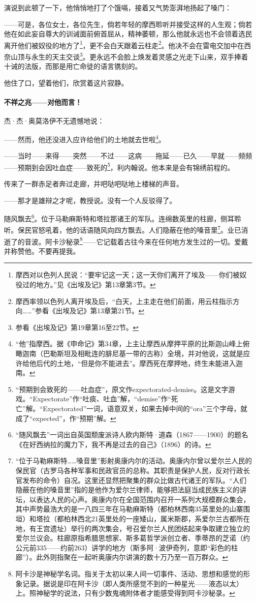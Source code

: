 \par 演说到此顿了一下，他悄悄地打了个饿嗝，接着又气势澎湃地扬起了嗓门：
\par ——可是，各位女士，各位先生，倘若年轻的摩西聆听并接受这样的人生观；倘若他在如此妄自尊大的训诫面前俯首屈从，精神萎顿，那么他就永远也不会领着选民离开他们被奴役的地方了\footnote{摩西对以色列人民说：“要牢记这一天；这一天你们离开了埃及——你们被奴役过的地方。”见《出埃及记》第13章第3节。}，更不会白天跟着云柱走\footnote{摩西率领以色列人离开埃及后，“白天，上主走在他们前面，用云柱指示方向……”参看《出埃及记》第13章第21节。}。他决不会在雷电交加中在西奈山顶与永生的天主交谈\footnote{参看《出埃及记》第19章第16至22节。}。更永远不会脸上焕发着灵感之光走下山来，双手捧着十诫的法版，而那是用亡命徒的语言镌刻的。
\par 他住了口，望着他们，欣赏着这片寂静。
\paragraph*{不祥之兆——对他而言！}
\par 杰·杰·奥莫洛伊不无遗憾地说：
\par ——然而，他还没进入应许给他们的土地就去世啦\footnote{“他”指摩西。据《申命记》第34章，上主让摩西从摩押平原的比斯迦山峰上俯瞰迦南（巴勒斯坦及相毗连的腓尼基一带的古称）全境，并对他说，这就是应许给他后代的土地，“但是你不能进去”。摩西死在摩押地，终生未能进入迦南。}。
\par ——当时——来得——突然——不过——这病——拖延——已久——早就——频频——预期到会因吐血症——致死的\footnote{“预期到会致死的——吐血症”，原文作expectorated-demise。这是文字游戏。“Expectorate”作“吐痰、吐血”解，“demise”作“死亡”解。“Expectorated”一词，语意双关，如果去掉中间的“ora”三个字母，就成了“expected”，作“预期”解。}，利内翰说。他本来是会有锦绣前程的。
\par 传来了一群赤足者奔过走廊，并吧哒吧哒地上楼梯的声音。
\par ——那才是雄辩之才呢，教授说。没有一个人反驳得了。
\par 随风飘去\footnote{“随风飘去”一词出自英国颓废派诗人欧内斯特·道森（1867——1900）的题名《在好西纳拉的魔力下，我不再是过去的自己》（1896）的诗。}。位于马勒麻斯特和塔拉那诸王的军队。连绵数英里的柱廊，侧耳聆听。保民官怒吼着，他的话语随风向四方飘去。人们隐蔽在他的嗓音里\footnote{“位于马勒麻斯特……嗓音里”影射奥康内尔的活动。奥康内尔曾以爱尔兰人民的保民官（古罗马各种军事和民政官员的总称。其职责是保护人民，反对行政长官发布的命令）自况。这里还显然把聚集的群众比做古代诸王的军队。“人们隐蔽在他的嗓音里”指的是他作为爱尔兰律师，能够把法庭当成民族主义的讲坛，以表达人民的心声。奥康内尔在全国范围内召开一系列大规模群众集会，其中声势最浩大的是一八四三年在马勒麻斯特（都柏林西南35英里处的山寨围垣）和塔拉（都柏林西北21英里处的一座矮山，属米斯郡，系爱尔兰古都所在地，有王宫遗址）举行的两次集会，号召爱尔兰人民团结起来争取建立独立的爱尔兰议会。柱廊原指希腊思想家、斯多葛哲学派创立者、季蒂昂的芝诺（约公元前335——约前263）讲学的地方（斯多阿·波伊奇列，意即“彩色的柱廊”）。此外则指聚在一起听奥康内尔讲演的数十万乃至一百万群众。}。业已消逝了的音波。阿卡沙秘录\footnote{阿卡沙是神秘学名词。指关于太初以来人间一切事件、活动、思想和感觉的形象记录。据说是印在阿卡沙（即人类所感觉不到的一种星光——液态以太）上。照神秘学的说法，只有少数鬼魂附体者才能感受得到阿卡沙秘录。}——它记载着古往今来在任何地方发生过的一切。爱戴并称赞他。不要再提我。
